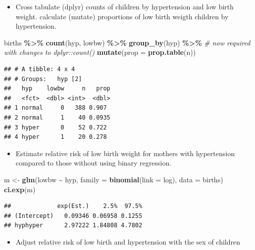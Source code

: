 \documentclass[
]{book}
\newenvironment{Shaded}{\begin{snugshade}}{\end{snugshade}}
\newcommand{\AttributeTok}[1]{\textcolor[rgb]{0.13,0.29,0.53}{#1}}
\newcommand{\CommentTok}[1]{\textcolor[rgb]{0.56,0.35,0.01}{\textit{#1}}}
\newcommand{\FunctionTok}[1]{\textcolor[rgb]{0.13,0.29,0.53}{\textbf{#1}}}
\newcommand{\NormalTok}[1]{#1}
\newcommand{\OtherTok}[1]{\textcolor[rgb]{0.56,0.35,0.01}{#1}}
\newcommand{\SpecialCharTok}[1]{\textcolor[rgb]{0.81,0.36,0.00}{\textbf{#1}}}
\providecommand{\tightlist}{%
  \setlength{\itemsep}{0pt}\setlength{\parskip}{0pt}}
\theoremstyle{definition}
\theoremstyle{definition}
\theoremstyle{definition}
\theoremstyle{definition}
\theoremstyle{remark}
\begin{document}
\begin{itemize}
\tightlist
\item
  Cross tabulate (dplyr) counts of children by hypertension and low birth weight.
  calculate (mutate) proportions of low birth weigth children by hypertension.
\end{itemize}

\begin{Shaded}
\begin{Highlighting}[]
\NormalTok{births }\SpecialCharTok{\%\textgreater{}\%}
  \FunctionTok{count}\NormalTok{(hyp, lowbw) }\SpecialCharTok{\%\textgreater{}\%}
  \FunctionTok{group\_by}\NormalTok{(hyp) }\SpecialCharTok{\%\textgreater{}\%} \CommentTok{\# now required with changes to dplyr::count()}
  \FunctionTok{mutate}\NormalTok{(}\AttributeTok{prop =} \FunctionTok{prop.table}\NormalTok{(n))}
\end{Highlighting}
\end{Shaded}

\begin{verbatim}
## # A tibble: 4 x 4
## # Groups:   hyp [2]
##   hyp    lowbw     n   prop
##   <fct>  <dbl> <int>  <dbl>
## 1 normal     0   388 0.907 
## 2 normal     1    40 0.0935
## 3 hyper      0    52 0.722 
## 4 hyper      1    20 0.278
\end{verbatim}

\begin{itemize}
\tightlist
\item
  Estimate relative risk of low birth weight for mothers with hypertension compared to those without using binary regression.
\end{itemize}

\begin{Shaded}
\begin{Highlighting}[]
\NormalTok{m }\OtherTok{\textless{}{-}} \FunctionTok{glm}\NormalTok{(lowbw }\SpecialCharTok{\textasciitilde{}}\NormalTok{ hyp, }\AttributeTok{family =} \FunctionTok{binomial}\NormalTok{(}\AttributeTok{link =}\NormalTok{ log), }\AttributeTok{data =}\NormalTok{ births)}
\FunctionTok{ci.exp}\NormalTok{(m)}
\end{Highlighting}
\end{Shaded}

\begin{verbatim}
##             exp(Est.)    2.5%  97.5%
## (Intercept)   0.09346 0.06958 0.1255
## hyphyper      2.97222 1.84808 4.7802
\end{verbatim}

\begin{itemize}
\tightlist
\item
  Adjust relative risk of low birth and hypertension with the sex of children
\end{itemize}
\end{document}
